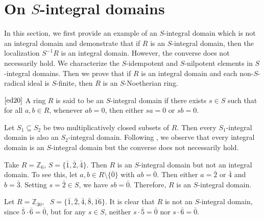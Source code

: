 \documentclass[11pt]{article}
\begin{document}
\section{On $S$-integral domains}
In this section, we first provide an example of an $S$-integral domain which is not an integral domain and demonstrate that if $R$ is an $S$-integral domain, then the localization $S^{-1}R$ is an integral domain. However, the converse does not necessarily hold. We characterize the $S$-idempotent and $S$-nilpotent elements in $S$-integral domains. Then we prove that if $R$ is an integral domain and each non-$S$-radical ideal is $S$-finite, then $R$ is an $S$-Noetherian ring.
	\noindent
	\begin{deff}$\cite{ed20}$\label{sintegral}
		A ring $R$ is said to be an $S$-integral domain if there exists $s \in S$ such that for all $a, b \in R$, whenever $ab = 0$, then either $sa = 0$ or $sb = 0$.
	\end{deff}
	\noindent
	Let $S_1\subseteq S_2$ be two multiplicatively closed subsets of $R$. Then every $S_1$-integral domain is also an $S_2$-integral domain. Following \cite{ed20}, we observe that every integral domain is an $S$-integral domain but the converse does not necessarily hold.
	
	\begin{eg}\label{sin}
		Take $R = \mathbb{Z}_{6}$, $S = \{\bar{1}, \bar{2}, \bar{4}\}$. Then $R$ is an $S$-integral domain but not an integral domain. To see this, let $a, b \in R \setminus\{\bar{0}\}$ with $ab = \bar{0}$. Then either $a = \bar{2}$ or $\bar{4}$ and $b = \bar{3}$. Setting $s = \bar{2} \in S$, we have $sb = \bar{0}$. Therefore, $R$ is an $S$-integral domain.
	\end{eg}
	\begin{eg}
		Let $R=\mathbb{Z}_{30}$, ~$S=\{\bar{1},\bar{2},\bar{4},\bar{8},\overline{16}\}$. It is clear that $R$ is not an $S$-integral domain, since $\bar{5} \cdot \bar{6} = \bar{0}$, but for any $s \in S$, neither $s \cdot \bar{5} = \bar{0}$ nor $s \cdot \bar{6} = \bar{0}$.
	\end{eg}
	
\end{document}
